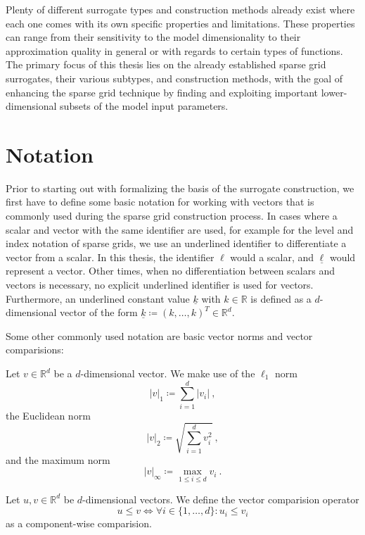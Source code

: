\documentclass[
  a4paper,  %
  twoside,  %
  bibliography=totoc,
  headsepline,
  cleardoublepage=empty,
  parskip=half,
  draft=false
]{scrbook}
\begin{document}
Plenty of different surrogate types and construction methods already exist where each one comes with its own specific properties and limitations.
These properties can range from their sensitivity to the model dimensionality to their approximation quality in general or with regards to certain types of functions. 
The primary focus of this thesis lies on the already established sparse grid surrogates, their various subtypes, and construction methods, with the goal of enhancing the sparse grid technique by finding and exploiting important lower-dimensional subsets of the model input parameters.

\section{Notation}

Prior to starting out with formalizing the basis of the surrogate construction, we first have to define some basic notation for working with vectors that is commonly used during the sparse grid construction process.
In cases where a scalar and vector with the same identifier are used, for example for the level and index notation of sparse grids, we use an underlined identifier to differentiate a vector from a scalar.
In this thesis, the identifier $\ell$ would a scalar, and $\underline{\ell}$ would represent a vector.
Other times, when no differentiation between scalars and vectors is necessary, no explicit underlined identifier is used for vectors. 
Furthermore, an underlined constant value $\underline{k}$ with $k \in\mathds{R}$ is defined as a $d$-dimensional vector of the form $\underline{k} \coloneqq (k, \dots, k)^T \in \mathds{R}^d$.

Some other commonly used notation are basic vector norms and vector comparisions:
\begin{definition}
Let $v \in \mathds{R}^d$ be a $d$-dimensional vector.
We make use of the $\ell_1$ norm
\begin{equation}
|v|_1 \coloneqq \sum_{i=1}^d |v_i| ~,
\nonumber
\end{equation}
the Euclidean norm
\begin{equation}
|v|_2 \coloneqq \sqrt{\sum_{i=1}^d v_i^2} ~,
\nonumber
\end{equation}
and the maximum norm
\begin{equation}
|v|_\infty \coloneqq \max_{1 \leq i \leq d} v_i ~.
\nonumber
\end{equation}
\end{definition}
%
\begin{definition}
Let $u, v \in \mathds{R}^d$ be $d$-dimensional vectors.
We define the vector comparision operator
\begin{equation}
u \leq v \Leftrightarrow \forall i \in \{1,\dots,d\} \colon u_i \leq v_i
\nonumber
\end{equation}
as a component-wise comparision.
\end{definition}
\end{document}
